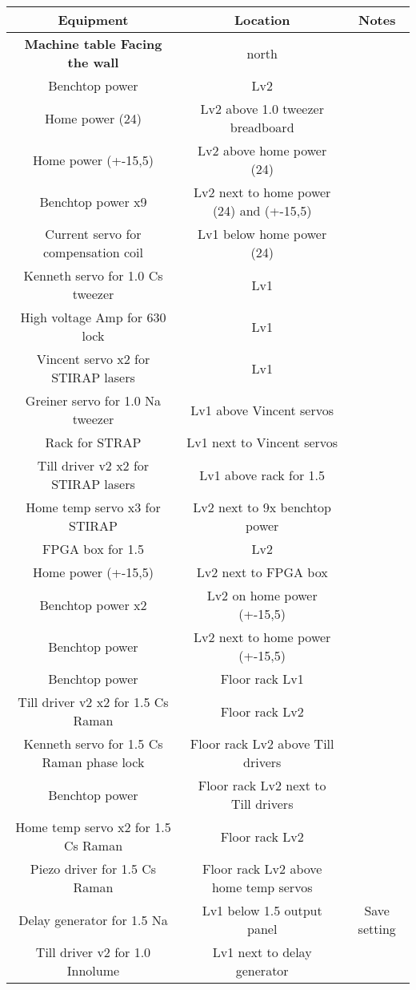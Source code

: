 \documentclass[10pt,fleqn,twocolumn]{article}
\begin{document}
\begin{longtable}{|c|c|c|}
  \hline
  \textbf{Equipment}&\textbf{Location}&\textbf{Notes}\\\hline
  \textbf{Machine table Facing the wall}&north&\\\hline
  Benchtop power&Lv2&\\\hline
  Home power (24)&Lv2 above 1.0 tweezer breadboard&\\\hline
  Home power (+-15,5)&Lv2 above home power (24)&\\\hline
  Benchtop power x9&Lv2 next to home power (24) and (+-15,5)&\\\hline
  Current servo for compensation coil&Lv1 below home power (24)&\\\hline
  Kenneth servo for 1.0 Cs tweezer&Lv1&\\\hline
  High voltage Amp for 630 lock&Lv1&\\\hline
  Vincent servo x2 for STIRAP lasers&Lv1&\\\hline
  Greiner servo for 1.0 Na tweezer&Lv1 above Vincent servos&\\\hline
  Rack for STRAP&Lv1 next to Vincent servos&\\\hline
  Till driver v2 x2 for STIRAP lasers&Lv1 above rack for 1.5&\\\hline
  Home temp servo x3 for STIRAP&Lv2 next to 9x benchtop power&\\\hline
  FPGA box for 1.5&Lv2&\\\hline
  Home power (+-15,5)&Lv2 next to FPGA box&\\\hline
  Benchtop power x2&Lv2 on home power (+-15,5)&\\\hline
  Benchtop power&Lv2 next to home power (+-15,5)&\\\hline
  Benchtop power&Floor rack Lv1&\\\hline
  Till driver v2 x2 for 1.5 Cs Raman&Floor rack Lv2&\\\hline
  Kenneth servo for 1.5 Cs Raman phase lock&Floor rack Lv2 above Till drivers&\\\hline
  Benchtop power&Floor rack Lv2 next to Till drivers&\\\hline
  Home temp servo x2 for 1.5 Cs Raman&Floor rack Lv2&\\\hline
  Piezo driver for 1.5 Cs Raman&Floor rack Lv2 above home temp servos&\\\hline
  Delay generator for 1.5 Na&Lv1 below 1.5 output panel&Save setting\\\hline
  Till driver v2 for 1.0 Innolume&Lv1 next to delay generator&\\\hline

\end{longtable}
\end{document}
